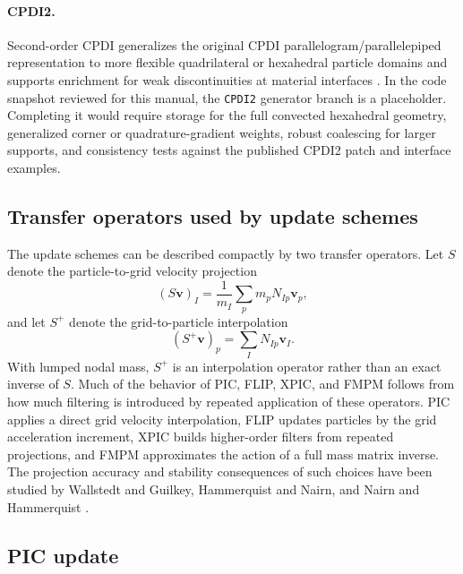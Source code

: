 \paragraph{CPDI2.}
Second-order CPDI generalizes the original CPDI parallelogram/parallelepiped representation to more flexible quadrilateral or hexahedral particle domains and supports enrichment for weak discontinuities at material interfaces \cite{sadeghirad2013cpdi2}.  In the code snapshot reviewed for this manual, the \texttt{CPDI2} generator branch is a placeholder.  Completing it would require storage for the full convected hexahedral geometry, generalized corner or quadrature-gradient weights, robust coalescing for larger supports, and consistency tests against the published CPDI2 patch and interface examples.

\subsection{Transfer operators used by update schemes}
\label{subsec:update-transfer-operators}

The update schemes can be described compactly by two transfer operators.  Let $S$ denote the particle-to-grid velocity projection
\begin{equation}
  (S\boldsymbol{v})_I = \frac{1}{m_I}\sum_p m_p N_{Ip}\boldsymbol{v}_p,
  \label{eq:operator-S}
\end{equation}
and let $S^+$ denote the grid-to-particle interpolation
\begin{equation}
  (S^+\boldsymbol{v})_p = \sum_I N_{Ip}\boldsymbol{v}_I.
  \label{eq:operator-S-plus}
\end{equation}
With lumped nodal mass, $S^+$ is an interpolation operator rather than an exact inverse of $S$.  Much of the behavior of PIC, FLIP, XPIC, and FMPM follows from how much filtering is introduced by repeated application of these operators.  PIC applies a direct grid velocity interpolation, FLIP updates particles by the grid acceleration increment, XPIC builds higher-order filters from repeated projections, and FMPM approximates the action of a full mass matrix inverse.  The projection accuracy and stability consequences of such choices have been studied by Wallstedt and Guilkey, Hammerquist and Nairn, and Nairn and Hammerquist \cite{wallstedt2007projection,wallstedt2008explicit,hammerquist2017xpic,nairn2021fmpm}.

\subsection{PIC update}
\label{subsec:pic-update}

